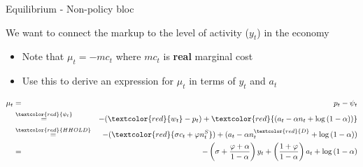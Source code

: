 \documentclass{beamer}
\begin{document}

	
\begin{frame}{Equilibrium - Non-policy bloc}

We want to connect the markup to the level of activity ($y_{t}$) in the economy
\begin{itemize}
\item	Note that $\mu_{t}=-mc_{t}$ where $mc_{t}$ is \textbf{real} marginal cost
\item	Use this to derive an expression for $\mu_{t}$ in terms of $y_{t}$ and $a_{t}$
\end{itemize}
\begin{eqnarray*}
\mu_{t} &=& p_{t} - \psi_{t}	\\
		&\stackrel{\textcolor{red}{\psi_{t}}}=& -(\textcolor{red}{w_{t}} - p_{t}) +\textcolor{red}{ (a_{t} - \alpha n_{t} + \log{(1-\alpha)})} \\
		&\stackrel{\textcolor{red}{HHOLD}}=& -(\textcolor{red}{\sigma c_{t} + \varphi n^{S}_{t}}) + (a_{t} - \alpha n^{\textcolor{red}{D}}_{t} + \log{(1-\alpha)}) \\
		&=& - \left( \sigma + \frac{\varphi + \alpha}{1-\alpha} \right)y_{t} + \left( \frac{1+\varphi}{1-\alpha} \right)a_{t} + \log{(1-\alpha)}
\end{eqnarray*}


\end{frame}


	
\end{document}

